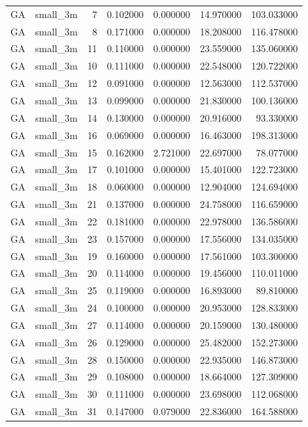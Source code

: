 \begin{tabular}{llrrrrr}
GA & small_3m & 7 & 0.102000 & 0.000000 & 14.970000 & 103.033000 \\
GA & small_3m & 8 & 0.171000 & 0.000000 & 18.208000 & 116.478000 \\
GA & small_3m & 11 & 0.110000 & 0.000000 & 23.559000 & 135.060000 \\
GA & small_3m & 10 & 0.111000 & 0.000000 & 22.548000 & 120.722000 \\
GA & small_3m & 12 & 0.091000 & 0.000000 & 12.563000 & 112.537000 \\
GA & small_3m & 13 & 0.099000 & 0.000000 & 21.830000 & 100.136000 \\
GA & small_3m & 14 & 0.130000 & 0.000000 & 20.916000 & 93.330000 \\
GA & small_3m & 16 & 0.069000 & 0.000000 & 16.463000 & 198.313000 \\
GA & small_3m & 15 & 0.162000 & 2.721000 & 22.697000 & 78.077000 \\
GA & small_3m & 17 & 0.101000 & 0.000000 & 15.401000 & 122.723000 \\
GA & small_3m & 18 & 0.060000 & 0.000000 & 12.904000 & 124.694000 \\
GA & small_3m & 21 & 0.137000 & 0.000000 & 24.758000 & 116.659000 \\
GA & small_3m & 22 & 0.181000 & 0.000000 & 22.978000 & 136.586000 \\
GA & small_3m & 23 & 0.157000 & 0.000000 & 17.556000 & 134.035000 \\
GA & small_3m & 19 & 0.160000 & 0.000000 & 17.561000 & 103.300000 \\
GA & small_3m & 20 & 0.114000 & 0.000000 & 19.456000 & 110.011000 \\
GA & small_3m & 25 & 0.119000 & 0.000000 & 16.893000 & 89.810000 \\
GA & small_3m & 24 & 0.100000 & 0.000000 & 20.953000 & 128.833000 \\
GA & small_3m & 27 & 0.114000 & 0.000000 & 20.159000 & 130.480000 \\
GA & small_3m & 26 & 0.129000 & 0.000000 & 25.482000 & 152.273000 \\
GA & small_3m & 28 & 0.150000 & 0.000000 & 22.935000 & 146.873000 \\
GA & small_3m & 29 & 0.108000 & 0.000000 & 18.664000 & 127.309000 \\
GA & small_3m & 30 & 0.111000 & 0.000000 & 23.698000 & 112.068000 \\
GA & small_3m & 31 & 0.147000 & 0.079000 & 22.836000 & 164.588000 \\

\end{tabular}
